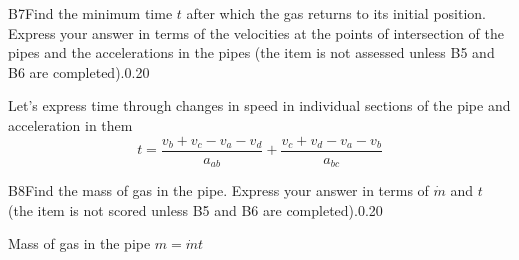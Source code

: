 \documentclass[11pt,a4paper]{article}
\begin{document}
\begin{solcard}{B7}{Find the minimum time $t$ after which the gas returns to its initial position. Express your answer in terms of the velocities at the points of intersection of the pipes and the accelerations in the pipes (the item is not assessed unless B5 and B6 are completed).}{0.20}

Let's express time through changes in speed in individual sections of the pipe and acceleration in them $$t=\frac{v_b+v_c-v_a-v_d}{a_{ab}}+\frac{v_c+v_d-v_a-v_b}{a_{bc}}$$

\end{solcard}

\begin{solcard}{B8}{Find the mass of gas in the pipe. Express your answer in terms of $\dot{m}$ and $t$ (the item is not scored unless B5 and B6 are completed).}{0.20}

Mass of gas in the pipe $m=\dot{m}t$

\end{solcard}
\end{document}
